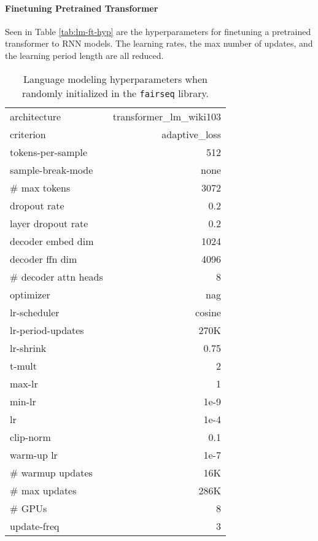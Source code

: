 \documentclass[11pt]{article}
\begin{document}
\paragraph{Finetuning Pretrained Transformer}
Seen in Table \ref{tab:lm-ft-hyp} are the hyperparameters for finetuning a pretrained transformer to RNN models. The learning rates, the max number of updates, and the learning period length are all reduced.
\begin{table}[h]
\small
\centering
\begin{tabular}{ |l r|}
\hline
architecture & transformer\_lm\_wiki103\\
criterion & adaptive\_loss \\
tokens-per-sample & 512 \\
sample-break-mode & none \\
\# max tokens & 3072\\
dropout rate & 0.2\\
layer dropout rate & 0.2\\
decoder embed dim  & 1024\\
decoder ffn dim  & 4096\\
\# decoder attn heads & 8\\
optimizer &  nag \\
lr-scheduler &  cosine \\
lr-period-updates &  270K \\
lr-shrink & 0.75 \\
t-mult & 2 \\
max-lr & 1 \\
min-lr & 1e-9 \\
lr &  1e-4 \\
clip-norm & 0.1\\
warm-up lr & 1e-7 \\
\# warmup updates & 16K \\
\# max updates &  286K \\
\# GPUs & 8 \\
update-freq & 3\\
\hline
\end{tabular}
\caption{Language modeling hyperparameters when randomly initialized in the \texttt{fairseq} library.}
\label{tab:lm-hyp}
\end{table}
\end{document}
